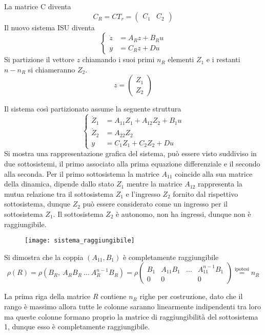 La matrice C diventa
$$
C_R = CT_r = \begin{pmatrix}
              C_1 & C_2
             \end{pmatrix}
$$
Il nuovo sistema ISU diventa
$$
\left\{\begin{aligned}
\dot{z} &= A_R z + B_R u \\
y &= C_Rz + Du
\end{aligned}\right.
$$
Si partizione il vettore $z$ chiamando i suoi primi $n_R$ elementi $Z_1$ e i
restanti $n-n_R$ si chiameranno $Z_2$.
$$
z = \begin{pmatrix}
Z_1 \\ Z_2
\end{pmatrix}
$$

Il sistema così partizionato assume la seguente struttura
$$
\left\{\begin{aligned}
\dot{Z}_1 &= A_{11}Z_1 + A_{12} Z_2 + B_1 u\\
\dot{Z}_2 &= A_{22}Z_2\\
y &= C_1Z_1 + C_2 Z_2 +Du
\end{aligned}\right.
$$
Si mostra una rappresentazione grafica del sistema, può essere visto suddiviso
in due sottosistemi, il primo associato alla prima equazione differenziale e il
secondo alla seconda.
Per il primo sottosistema la matrice $A_{11}$ coincide alla sua matrice della
dinamica, dipende dallo stato $Z_1$ mentre la matrice $A_{12}$ rappresenta la
mutua relazione tra il sottosistema $Z_1$ e l'ingresso $Z_2$ fornito dal
rispettivo sottosistema, dunque $Z_2$ può essere considerato come un ingresso
per il sottosistema $Z_1$.
Il sottosistema $Z_2$ è autonomo, non ha ingressi, dunque non è raggiungibile.
\begin{figure}[h]
 \centering
 \texttt{[image: sistema\_raggiungibile]}
\end{figure}

Si dimostra che la coppia $(A_{11},B_1)$ è completamente raggiungibile
$$
\rho({R}) = \rho\left(B_R,\ A_RB_R\ \dots\ A_R^{n-1}B_R\right) = \rho
\begin{pmatrix}
B_1 & A_{11}B_1 & \ldots & A_{11}^{n-1}B_1\\
 0  &     0     &        &   0
\end{pmatrix}
\stackrel{\text{ipotesi}}{=}n_R
$$

La prima riga della matrice $R$ contiene $n_R$ righe per costruzione, dato che
il rango è massimo allora tutte le colonne saranno linearmente indipendenti tra
loro ma queste colonne formano proprio la matrice di raggiungibilità del
sottosistema 1, dunque esso è completamente raggiungibile.

